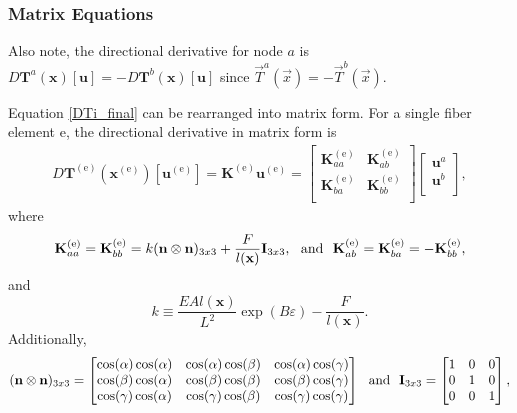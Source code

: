 \subsubsection{Matrix Equations}
Also note,  the directional derivative for node $a$ is $D \textbf{T}^a(\textbf{x})[\textbf{u}] = - D\textbf{T}^b(\textbf{x})[\textbf{u}]$ since \(\vec{T}^a(\vec{x})=-\vec{T}^b(\vec{x})\).

Equation \eqref{DTi_final} can be rearranged into matrix form. For a single fiber element e, the directional derivative in matrix form is 
%
\begin{eqnarray}
D\textbf{T}^{(\text{e})}(\textbf{x}^{(\text{e})})[\textbf{u}^{(\text{e})}] = \textbf{K}^{(\text{e})}\textbf{u}^{(\text{e})} = 
\begin{bmatrix} 
\textbf{K}^{(\text{e})}_{aa} & \textbf{K}^{(\text{e})}_{ab} \\ 
\textbf{K}^{(\text{e})}_{ba}& \textbf{K}^{(\text{e})}_{bb} \\
\end{bmatrix}
\begin{bmatrix} 
\textbf{u}^{a}  \\ 
\textbf{u}^{b} \\ 
\end{bmatrix},
\label{DT^e_matrix}
\end{eqnarray}
%
where
%
\begin{equation}
\textbf{K}^{(\text{e})}_{aa} = \textbf{K}^{(\text{e})}_{bb} = k (\textbf{n} \otimes \textbf{n})_{3x3} + \frac{F}{l(\textbf{x})}\textbf{\text{I}}_{3x3}, \ \ \text{and} \ \ \textbf{K}^{(\text{e})}_{ab} = \textbf{K}^{(\text{e})}_{ba} = -\textbf{K}^{(\text{e})}_{bb},
\label{K_aa}
\end{equation}
%
and
%
\begin{equation}
k \equiv \frac{E A  l(\textbf{x})}{L^2} \exp(B \varepsilon) -\frac{F}{l(\textbf{x})}.
\label{k}
\end{equation}
%
Additionally, 
%
\begin{eqnarray}
(\textbf{n} \otimes \textbf{n})_{3x3} = 
\begin{bmatrix}
\cos(\alpha)\cos(\alpha) & \cos(\alpha) \cos(\beta) & \cos(\alpha) \cos(\gamma) \\
\cos(\beta)\cos(\alpha) & \cos(\beta)\cos(\beta) & \cos(\beta)\cos(\gamma) \\
\cos(\gamma)\cos(\alpha) & \cos(\gamma)\cos(\beta) & \cos(\gamma)\cos(\gamma) 
\end{bmatrix} \ \ \text{and} \ \
%
\textbf{\text{I}}_{3x3} =
\begin{bmatrix}
1 & 0 & 0 \\
0 & 1 & 0 \\
0 & 0 & 1
\end{bmatrix},
\end{eqnarray}
